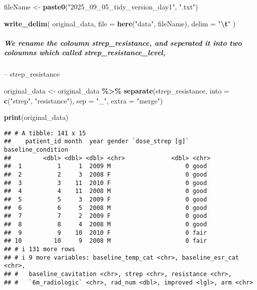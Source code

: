 \documentclass[
]{article}
\newenvironment{Shaded}{\begin{snugshade}}{\end{snugshade}}
\newcommand{\AttributeTok}[1]{\textcolor[rgb]{0.13,0.29,0.53}{#1}}
\newcommand{\FunctionTok}[1]{\textcolor[rgb]{0.13,0.29,0.53}{\textbf{#1}}}
\newcommand{\NormalTok}[1]{#1}
\newcommand{\OtherTok}[1]{\textcolor[rgb]{0.56,0.35,0.01}{#1}}
\newcommand{\SpecialCharTok}[1]{\textcolor[rgb]{0.81,0.36,0.00}{\textbf{#1}}}
\newcommand{\StringTok}[1]{\textcolor[rgb]{0.31,0.60,0.02}{#1}}
\begin{document}
\begin{Shaded}
\begin{Highlighting}[]
\NormalTok{fileName }\OtherTok{\textless{}{-}} \FunctionTok{paste0}\NormalTok{(}\StringTok{"2025\_09\_05\_tidy\_version\_day1"}\NormalTok{, }\StringTok{".txt"}\NormalTok{)}

\FunctionTok{write\_delim}\NormalTok{(}
\NormalTok{  original\_data, }
  \AttributeTok{file =} \FunctionTok{here}\NormalTok{(}\StringTok{"data"}\NormalTok{, fileName),}
  \AttributeTok{delim =} \StringTok{"}\SpecialCharTok{\textbackslash{}t}\StringTok{"}
\NormalTok{)}
\end{Highlighting}
\end{Shaded}

\subparagraph{We rename the coloumn strep\_resistance, and seperated it
into two coloumns which called
strep\_resistance\_level,}\label{we-rename-the-coloumn-strep_resistance-and-seperated-it-into-two-coloumns-which-called-strep_resistance_level}

-- strep\_resistance

\begin{Shaded}
\begin{Highlighting}[]
\NormalTok{original\_data }\OtherTok{\textless{}{-}}\NormalTok{ original\_data }\SpecialCharTok{\%\textgreater{}\%}
  \FunctionTok{separate}\NormalTok{(strep\_resistance, }\AttributeTok{into =} \FunctionTok{c}\NormalTok{(}\StringTok{"strep"}\NormalTok{, }\StringTok{"resistance"}\NormalTok{), }\AttributeTok{sep =} \StringTok{"\_"}\NormalTok{, }\AttributeTok{extra =} \StringTok{"merge"}\NormalTok{)}

\FunctionTok{print}\NormalTok{(original\_data)}
\end{Highlighting}
\end{Shaded}

\begin{verbatim}
## # A tibble: 141 x 15
##    patient_id month  year gender `dose_strep [g]` baseline_condition
##         <dbl> <dbl> <dbl> <chr>             <dbl> <chr>             
##  1          1     1  2009 M                     0 good              
##  2          2     3  2008 F                     0 good              
##  3          3    11  2010 F                     0 good              
##  4          4    11  2008 M                     0 good              
##  5          5     3  2009 F                     0 good              
##  6          6     5  2008 M                     0 good              
##  7          7     2  2009 F                     0 good              
##  8          8     4  2008 M                     0 good              
##  9          9    10  2010 F                     0 fair              
## 10         10     9  2008 M                     0 fair              
## # i 131 more rows
## # i 9 more variables: baseline_temp_cat <chr>, baseline_esr_cat <chr>,
## #   baseline_cavitation <chr>, strep <chr>, resistance <chr>,
## #   `6m_radiologic` <chr>, rad_num <dbl>, improved <lgl>, arm <chr>
\end{verbatim}
\end{document}
